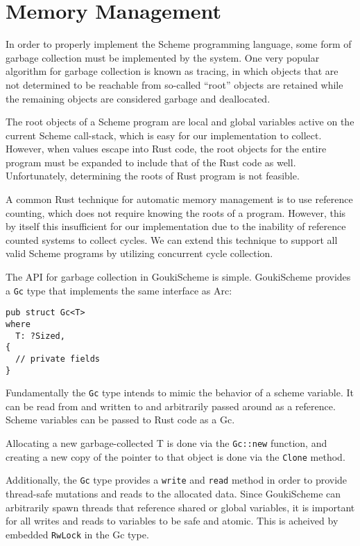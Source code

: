 \documentclass[sigplan,authordraft]{acmart}
\begin{document}
\section{Memory Management}

In order to properly implement the Scheme programming language, some form of
garbage collection must be implemented by the system. One very popular algorithm
for garbage collection is known as tracing, in which objects that are not
determined to be reachable from so-called ``root'' objects are retained while 
the remaining objects are considered garbage and deallocated\cite{lisptracing}.

The root objects of a Scheme program are local and global variables active on the
current Scheme call-stack, which is easy for our implementation to collect.
However, when values escape into Rust code, the root objects for the entire
program must be expanded to include that of the Rust code as well. Unfortunately,
determining the roots of Rust program is not feasible\cite{rusttracing}.

A common Rust technique for automatic memory management is to use reference
counting, which does not require knowing the roots of a program. However, this
by itself this insufficient for our implementation due to the inability of
reference counted systems to collect cycles\cite{rc}. We can extend this
technique to support all valid Scheme programs by utilizing concurrent cycle
collection\cite{cc}.

The API for garbage collection in GoukiScheme is simple. GoukiScheme provides a
\texttt{Gc} type that implements the same interface as Arc:

\begin{verbatim}
pub struct Gc<T>
where
  T: ?Sized,
{
  // private fields
}
\end{verbatim}

Fundamentally the \texttt{Gc} type intends to mimic the behavior of a scheme variable.
It can be read from and written to and arbitrarily passed around as a
reference. Scheme variables can be passed to Rust code as a Gc. 

Allocating a new garbage-collected T is done via the \texttt{Gc::new} function, and
creating a new copy of the pointer to that object is done via the \texttt{Clone}
method.

Additionally, the \texttt{Gc} type provides a \texttt{write} and \texttt{read}
method in order to provide thread-safe mutations and reads to the allocated
data. Since GoukiScheme can arbitrarily spawn threads that reference shared or
global variables, it is important for all writes and reads to variables to be safe
and atomic. This is acheived by embedded \texttt{RwLock} in the Gc type.
\end{document}
